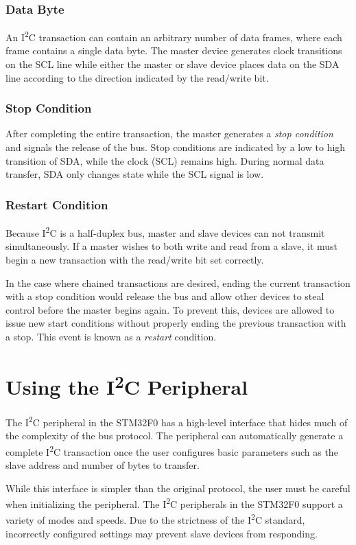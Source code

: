 \documentclass[11pt,fleqn]{book} %
\begin{document}
        \subsubsection{Data Byte}
        An I\textsuperscript{2}C transaction can contain an arbitrary number of data frames, where each frame contains a single data byte. The master device generates clock transitions on the SCL line while either the master or slave device places data on the SDA line according to the direction indicated by the read/write bit. 
        \subsubsection{Stop Condition}
        After completing the entire transaction, the master generates a \textit{stop condition} and signals the release of the bus. Stop conditions are indicated by a low to high transition of SDA, while the clock (SCL) remains high. During normal data transfer, SDA only changes state while the SCL signal is low. 
        \subsubsection{Restart Condition}
        Because I\textsuperscript{2}C is a half-duplex bus, master and slave devices can not transmit simultaneously. If a master wishes to both write and read from a slave, it must begin a new transaction with the read/write bit set correctly. 
        
        In the case where chained transactions are desired, ending the current transaction with a stop condition would release the bus and allow other devices to steal control before the master begins again. To prevent this, devices are allowed to issue new start conditions without properly ending the previous transaction with a stop. This event is known as a \textit{restart} condition. 

\section{Using the I\textsuperscript{2}C Peripheral}
    The I\textsuperscript{2}C peripheral in the STM32F0 has a high-level interface that hides much of the complexity of the bus protocol. The peripheral can automatically generate a complete I\textsuperscript{2}C transaction once the user configures basic parameters such as the slave address and number of bytes to transfer. 
    
    While this interface is simpler than the original protocol, the user must be careful when initializing the peripheral. The I\textsuperscript{2}C peripherals in the STM32F0 support a variety of modes and speeds. Due to the strictness of the I\textsuperscript{2}C standard, incorrectly configured settings may prevent slave devices from responding.
\end{document}
